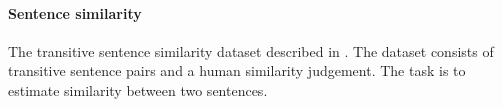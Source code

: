 \paragraph{Sentence similarity}
\label{sec:sentence-similarity}

The transitive sentence similarity dataset described in
\cite{kartsaklis2013separating}. The dataset consists of transitive sentence
pairs and a human similarity judgement. The task is to estimate similarity
between two sentences.







